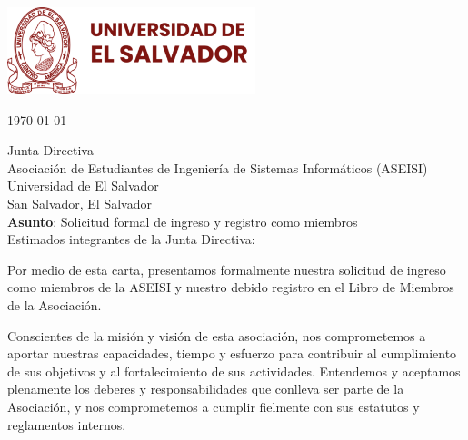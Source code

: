 \documentclass[12pt, a4paper]{letter} %
\begin{document}
\begin{minipage}{0.6\textwidth}
\includegraphics[height=1in]{../Logos/ues-logo.png}
\end{minipage}
\hfill
\vspace{2cm}
\today

Junta Directiva\\
Asociación de Estudiantes de Ingeniería de Sistemas Informáticos (ASEISI)\\
Universidad de El Salvador\\
San Salvador, El Salvador\\

\textbf{Asunto}: Solicitud formal de ingreso y registro como miembros\\

Estimados integrantes de la Junta Directiva:

Por medio de esta carta, presentamos formalmente nuestra solicitud de ingreso como miembros de la ASEISI y nuestro debido registro en el Libro de Miembros de la Asociación.

Conscientes de la misión y visión de esta asociación, nos comprometemos a aportar nuestras capacidades, tiempo y esfuerzo para contribuir al cumplimiento de sus objetivos y al fortalecimiento de sus actividades. Entendemos y aceptamos plenamente los deberes y responsabilidades que conlleva ser parte de la Asociación, y nos comprometemos a cumplir fielmente con sus estatutos y reglamentos internos.
\end{document}
